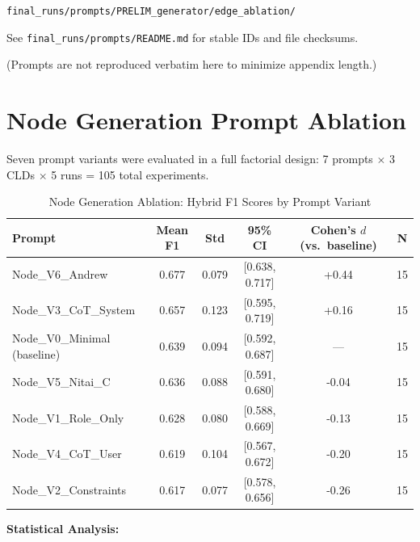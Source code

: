 \noindent\texttt{final\_runs/prompts/PRELIM\_generator/edge\_ablation/}

\noindent See \texttt{final\_runs/prompts/README.md} for stable IDs and file checksums.

\noindent (Prompts are not reproduced verbatim here to minimize appendix length.)

\chapter{Node Generation Prompt Ablation}
\label{sec:ablation_node}

Seven prompt variants were evaluated in a full factorial design: 7 prompts $\times$ 3 CLDs $\times$ 5 runs = 105 total experiments.

\begin{table}[H]
\centering
\caption{Node Generation Ablation: Hybrid F1 Scores by Prompt Variant}
\label{tab:node_ablation}
\footnotesize
\begin{tabular}{@{}lccccc@{}}
\toprule
\textbf{Prompt} & \textbf{Mean F1} & \textbf{Std} & \textbf{95\% CI} & \textbf{Cohen's $d$ (vs.\ baseline)} & \textbf{N} \\
\midrule
Node\_V6\_Andrew & 0.677 & 0.079 & [0.638, 0.717] & +0.44 & 15 \\
Node\_V3\_CoT\_System & 0.657 & 0.123 & [0.595, 0.719] & +0.16 & 15 \\
Node\_V0\_Minimal (baseline) & 0.639 & 0.094 & [0.592, 0.687] & --- & 15 \\
Node\_V5\_Nitai\_C & 0.636 & 0.088 & [0.591, 0.680] & -0.04 & 15 \\
Node\_V1\_Role\_Only & 0.628 & 0.080 & [0.588, 0.669] & -0.13 & 15 \\
Node\_V4\_CoT\_User & 0.619 & 0.104 & [0.567, 0.672] & -0.20 & 15 \\
Node\_V2\_Constraints & 0.617 & 0.077 & [0.578, 0.656] & -0.26 & 15 \\
\bottomrule
\end{tabular}
\end{table}

\textbf{Statistical Analysis:}
\begin{itemize}[noitemsep]
\end{itemize}

